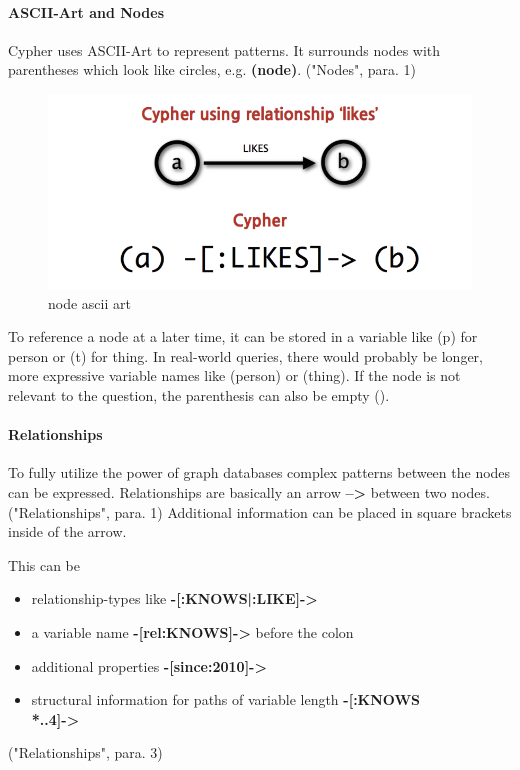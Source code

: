\paragraph{ASCII-Art and Nodes}

Cypher uses ASCII-Art to represent patterns. It surrounds nodes with parentheses which look like circles, e.g. \textbf{(node)}. \cite{NeoTechnologyInc.2017d}("Nodes", para. 1)

\begin{figure}[H]
	\includegraphics[width=\linewidth,keepaspectratio]{images/neo4j/cypher_pattern_simple.png}
	\caption{node ascii art}
\end{figure}

To reference a node at a later time, it can be stored in a variable like (p) for person or (t) for thing.
In real-world queries, there would probably be longer, more expressive variable names like (person) or (thing).
If the node is not relevant to the question, the parenthesis can also be empty ().

\paragraph{Relationships}

To fully utilize the power of graph databases complex patterns between the nodes can be expressed.
Relationships are basically an arrow \textbf{-->} between two nodes. \cite{NeoTechnologyInc.2017d} ("Relationships", para. 1)
Additional information can be placed in square brackets inside of the arrow.

This can be

\begin{itemize}
	\item relationship-types like \textbf{-[:KNOWS|:LIKE]->}
	\item a variable name \textbf{-[rel:KNOWS]->} before the colon
	\item additional properties \textbf{-[{since:2010}]->}
	\item structural information for paths of variable length \textbf{-[:KNOWS\\*..4]->}
\end{itemize} 
\cite{NeoTechnologyInc.2017d} ("Relationships", para. 3)

